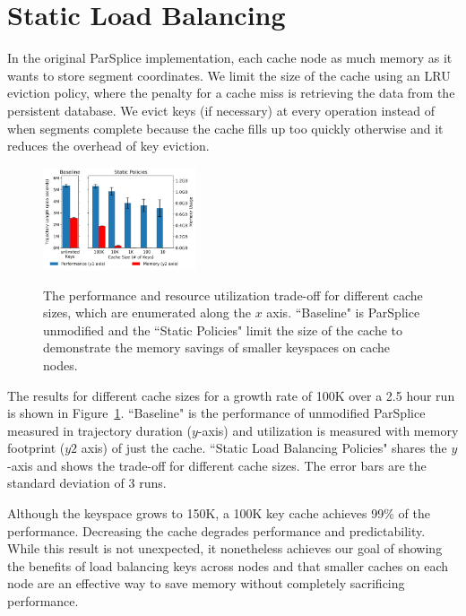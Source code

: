 \section{Static Load Balancing}
\label{sec:static-load-balancing}

In the original ParSplice implementation, each cache node as much memory as it
wants to store segment coordinates. We limit the size of the cache using an LRU
eviction policy, where the penalty for a cache miss is retrieving the data from
the persistent database.  We evict keys (if necessary) at every operation
instead of when segments complete because the cache fills up too quickly
otherwise and it reduces the overhead of key eviction.

\begin{figure}[t]
  \noindent\includegraphics[width=0.4\textwidth]{figures/methodology-tradeoff.png}\\
  \caption{The performance and resource utilization trade-off for different
  cache sizes, which are enumerated along the \(x\) axis. ``Baseline" is
  ParSplice unmodified and the ``Static  Policies" limit the size of the
  cache to demonstrate the memory savings of smaller keyspaces on cache nodes.
  \label{fig:methodology-tradeoff}}
\end{figure}

The results for different cache sizes for a growth rate of 100K over a 2.5 hour
run is shown in Figure~\ref{fig:methodology-tradeoff}.  ``Baseline" is the
performance of unmodified ParSplice  measured in trajectory duration
(\(y\)-axis) and utilization is measured with memory footprint (\(y2\) axis) of
just the cache.  ``Static Load Balancing Policies" shares the \(y\)-axis and
shows the trade-off for different cache sizes. The error bars are the standard
deviation of 3 runs. 

Although the keyspace grows to 150K, a 100K key cache achieves 99\% of the
performance. Decreasing the cache degrades performance and predictability.
While this result is not unexpected, it nonetheless achieves our goal of
showing the benefits of load balancing keys across nodes and that smaller
caches on each node are an effective way to save memory without completely
sacrificing performance.
